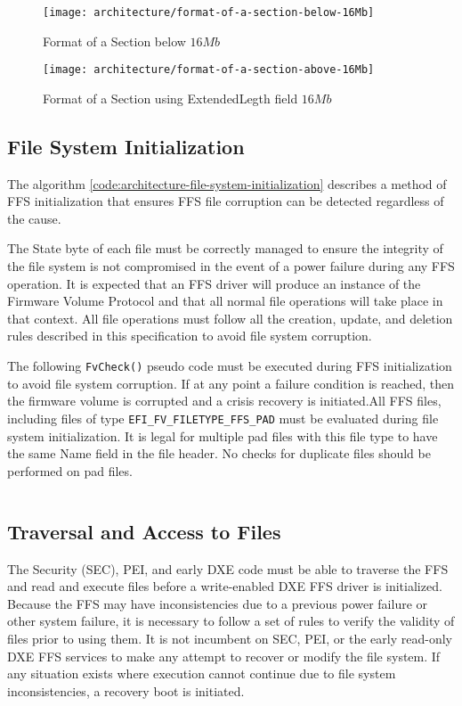 \begin{figure}[!htbp]
	\centering
	\texttt{[image: architecture/format-of-a-section-below-16Mb]}
	\caption{Format of a Section below $ 16Mb $}\label{fig:architecture-format-of-a-section-below-16Mb}
\end{figure}

\begin{figure}[!htbp]
	\centering
	\texttt{[image: architecture/format-of-a-section-above-16Mb]}
	\caption{Format of a Section using ExtendedLegth field $ 16Mb $}\label{fig:architecture-format-of-a-section-above-16Mb}
\end{figure}


\subsection{File System Initialization}\label{subsection:file-system-initialization}
The algorithm \ref{code:architecture-file-system-initialization} describes a method of FFS initialization that ensures FFS file corruption can be detected regardless of the cause.

The State byte of each file must be correctly managed to ensure the integrity of the file system is
not compromised in the event of a power failure during any FFS operation. It is expected that an FFS
driver will produce an instance of the Firmware Volume Protocol and that all normal file operations
will take place in that context. All file operations must follow all the creation, update, and deletion
rules described in this specification to avoid file system corruption.

The following \verb|FvCheck()| pseudo code must be executed during FFS initialization to avoid file
system corruption. If at any point a failure condition is reached, then the firmware volume is
corrupted and a crisis recovery is initiated.All FFS files, including files of type
\verb|EFI_FV_FILETYPE_FFS_PAD| must be evaluated during file system initialization. It is legal for
multiple pad files with this file type to have the same Name field in the file header. No checks for
duplicate files should be performed on pad files.

\inputminted{c}{code/architecture-file-system-initialization.c}\label{code:architecture-file-system-initialization}

\subsection{Traversal and Access to Files}
The Security (SEC), PEI, and early DXE code must be able to traverse the FFS and read and execute
files before a write-enabled DXE FFS driver is initialized. Because the FFS may have
inconsistencies due to a previous power failure or other system failure, it is necessary to follow a set
of rules to verify the validity of files prior to using them. It is not incumbent on SEC, PEI, or the
early read-only DXE FFS services to make any attempt to recover or modify the file system. If any
situation exists where execution cannot continue due to file system inconsistencies, a recovery boot
is initiated.

